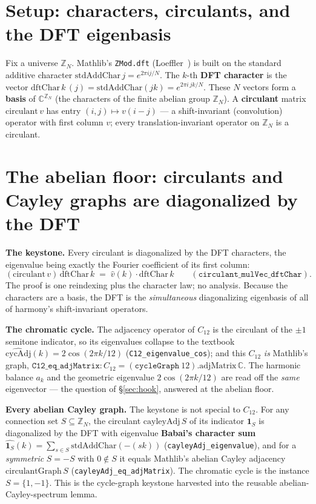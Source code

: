 \documentclass[11pt]{article}
\newcommand{\lean}[1]{\texttt{#1}}
\newcommand{\Zn}[1]{\mathbb{Z}_{#1}}
\begin{document}
\section{Setup: characters, circulants, and the DFT eigenbasis}\label{sec:setup}

Fix a universe $\Zn{N}$. Mathlib's \lean{ZMod.dft} (Loeffler~\cite{Loeffler}) is built on the standard
additive character $\mathrm{stdAddChar}\,j=e^{2\pi ij/N}$. The $k$-th \textbf{DFT character} is the vector
$\mathrm{dftChar}\,k\,(j)=\mathrm{stdAddChar}(jk)=e^{2\pi i\,jk/N}$. These $N$ vectors form a \textbf{basis}
of $\mathbb{C}^{\Zn{N}}$ (the characters of the finite abelian group $\Zn{N}$). A \textbf{circulant} matrix
$\mathrm{circulant}\,v$ has entry $(i,j)\mapsto v(i-j)$ --- a shift-invariant (convolution) operator with
first column $v$; every translation-invariant operator on $\Zn{N}$ is a circulant.

\section{The abelian floor: circulants and Cayley graphs are diagonalized by the DFT}\label{sec:abelian}

\textbf{The keystone.} Every circulant is diagonalized by the DFT characters, the eigenvalue being exactly
the Fourier coefficient of its first column:
\[
  (\mathrm{circulant}\,v)\,\mathrm{dftChar}\,k \;=\; \hat v(k)\cdot\mathrm{dftChar}\,k
  \qquad(\lean{circulant\_mulVec\_dftChar}).
\]
The proof is one reindexing plus the character law; no analysis. Because the characters are a basis, the
DFT is the \emph{simultaneous} diagonalizing eigenbasis of all of harmony's shift-invariant operators.

\textbf{The chromatic cycle.} The adjacency operator of $C_{12}$ is the circulant of the $\pm1$ semitone
indicator, so its eigenvalues collapse to the textbook
$\hat{\mathrm{cycAdj}}(k)=2\cos(2\pi k/12)$ (\lean{C12\_eigenvalue\_cos}); and this $C_{12}$ \emph{is}
Mathlib's graph, $\lean{C12\_eq\_adjMatrix}: C_{12}=(\texttt{cycleGraph}\ 12).\mathrm{adjMatrix}\,\mathbb{C}$.
The harmonic balance $a_k$ and the geometric eigenvalue $2\cos(2\pi k/12)$ are read off the \emph{same}
eigenvector --- the question of \S\ref{sec:hook}, answered at the abelian floor.

\textbf{Every abelian Cayley graph.} The keystone is not special to $C_{12}$. For any connection set
$S\subseteq\Zn{N}$, the circulant $\mathrm{cayleyAdj}\,S$ of its indicator $\mathbf 1_S$ is diagonalized by
the DFT with eigenvalue \textbf{Babai's character sum}~\cite{Babai}
$\hat{\mathbf 1_S}(k)=\sum_{s\in S}\mathrm{stdAddChar}(-(sk))$ (\lean{cayleyAdj\_eigenvalue}), and for a
\emph{symmetric} $S=-S$ with $0\notin S$ it equals Mathlib's abelian Cayley adjacency
$\mathrm{circulantGraph}\,S$ (\lean{cayleyAdj\_eq\_adjMatrix}). The chromatic cycle is the instance
$S=\{1,-1\}$. This is the cycle-graph keystone harvested into the reusable abelian-Cayley-spectrum lemma.
\end{document}
